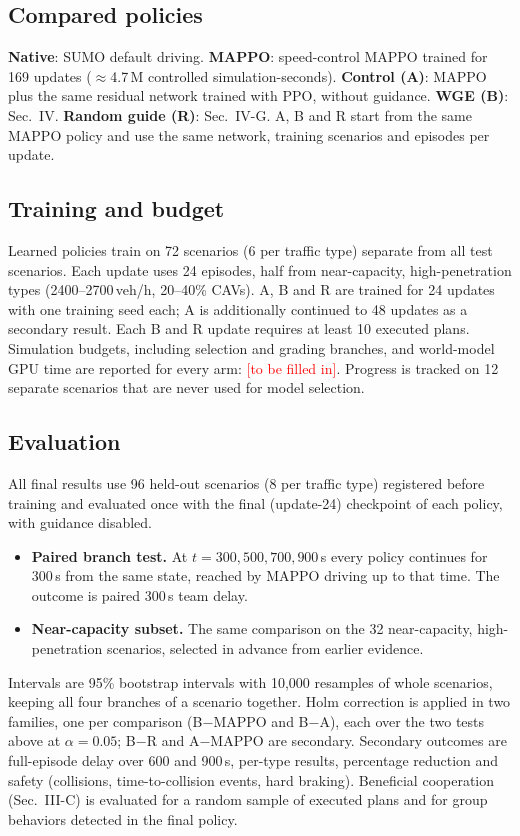 \documentclass[conference]{IEEEtran}
\newcommand{\tbf}{\textcolor{red}{[to be filled in]}}
\begin{document}
\subsection{Compared policies}
\textbf{Native}: SUMO default driving. \textbf{MAPPO}: speed-control MAPPO trained for 169 updates ($\approx$4.7\,M controlled simulation-seconds). %
\textbf{Control (A)}: MAPPO plus the same residual network trained with PPO, without guidance. \textbf{WGE (B)}: Sec.~IV. \textbf{Random guide (R)}: Sec.~IV-G. A, B and R start from the same MAPPO policy and use the same network, training scenarios and episodes per update.

\subsection{Training and budget}
Learned policies train on 72 scenarios (6 per traffic type) separate from all test scenarios. Each update uses 24 episodes, half from near-capacity, high-penetration types (2400--2700\,veh/h, 20--40\% CAVs). A, B and R are trained for 24 updates with one training seed each; A is additionally continued to 48 updates as a secondary result. Each B and R update requires at least 10 executed plans. Simulation budgets, including selection and grading branches, and world-model GPU time are reported for every arm: \tbf. %
Progress is tracked on 12 separate scenarios that are never used for model selection.

\subsection{Evaluation}
All final results use 96 held-out scenarios (8 per traffic type) registered before training and evaluated once with the final (update-24) checkpoint of each policy, with guidance disabled. %
\begin{itemize}
\item \textbf{Paired branch test.} At $t=300,500,700,900$\,s every policy continues for 300\,s from the same state, reached by MAPPO driving up to that time. The outcome is paired 300\,s team delay. %
\item \textbf{Near-capacity subset.} The same comparison on the 32 near-capacity, high-penetration scenarios, selected in advance from earlier evidence.
\end{itemize}
Intervals are 95\% bootstrap intervals with 10{,}000 resamples of whole scenarios, keeping all four branches of a scenario together. Holm correction is applied in two families, one per comparison (B$-$MAPPO and B$-$A), each over the two tests above at $\alpha=0.05$; B$-$R and A$-$MAPPO are secondary. %
Secondary outcomes are full-episode delay over 600 and 900\,s, per-type results, percentage reduction and safety (collisions, time-to-collision events, hard braking). Beneficial cooperation (Sec.~III-C) is evaluated for a random sample of executed plans and for group behaviors detected in the final policy.
\end{document}

